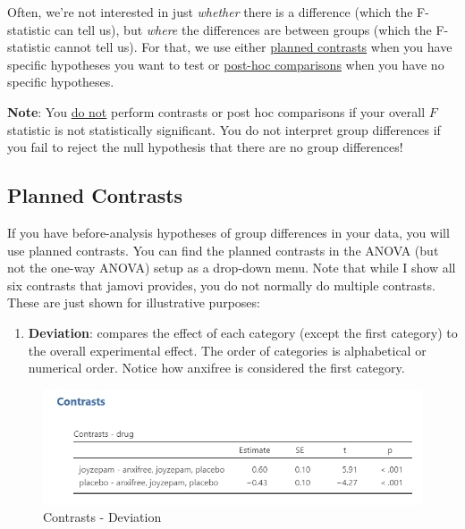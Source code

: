 \documentclass[
]{book}
\providecommand{\tightlist}{%
  \setlength{\itemsep}{0pt}\setlength{\parskip}{0pt}}
\begin{document}
Often, we're not interested in just \emph{whether} there is a difference (which the F-statistic can tell us), but \emph{where} the differences are between groups (which the F-statistic cannot tell us). For that, we use either \underline{planned contrasts} when you have specific hypotheses you want to test or \underline{post-hoc comparisons} when you have no specific hypotheses.

\textbf{Note}: You \underline{do not} perform contrasts or post hoc comparisons if your overall \(F\) statistic is not statistically significant. You do not interpret group differences if you fail to reject the null hypothesis that there are no group differences!

\hypertarget{planned-contrasts}{%
\subsection{Planned Contrasts}\label{planned-contrasts}}

If you have before-analysis hypotheses of group differences in your data, you will use planned contrasts. You can find the planned contrasts in the ANOVA (but not the one-way ANOVA) setup as a drop-down menu. Note that while I show all six contrasts that jamovi provides, you do not normally do multiple contrasts. These are just shown for illustrative purposes:

\begin{enumerate}
\def\labelenumi{\arabic{enumi}.}
\tightlist
\item
  \textbf{Deviation}: compares the effect of each category (except the first category) to the overall experimental effect. The order of categories is alphabetical or numerical order. Notice how anxifree is considered the first category.
\end{enumerate}

\begin{figure}

{\centering \includegraphics[width=1\linewidth]{images/04_one-way-anova/contrasts_deviation} 

}

\caption{Contrasts - Deviation}\label{fig:unnamed-chunk-9}
\end{figure}
\end{document}
